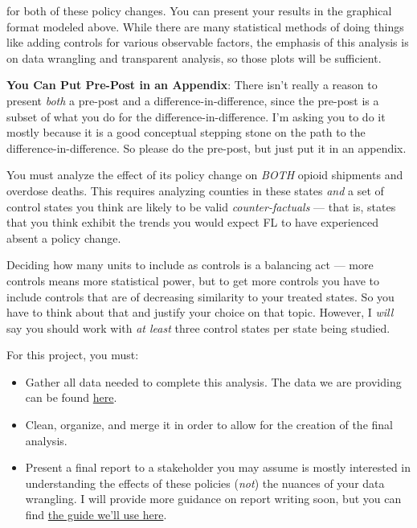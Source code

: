 \documentclass[12pt]{article}
\begin{document}
for both of these policy changes. You can present your results in the graphical format modeled above. While there are many statistical methods of doing things like adding controls for various observable factors, the emphasis of this analysis is on data wrangling and transparent analysis, so those plots will be sufficient.

\textbf{You Can Put Pre-Post in an Appendix}: There isn't really a reason to present \emph{both} a pre-post and a difference-in-difference, since the pre-post is a subset of what you do for the difference-in-difference. I'm asking you to do it mostly because it is a good conceptual stepping stone on the path to the difference-in-difference. So please do the pre-post, but just put it in an appendix.

You must analyze the effect of its policy change on \emph{BOTH} opioid shipments and overdose deaths. This requires analyzing counties in these states \emph{and} a set of control states you think are likely to be valid \emph{counter-factuals} — that is, states that you think exhibit the trends you would expect FL to have experienced absent a policy change. 

Deciding how many units to include as controls is a balancing act — more controls means more statistical power, but to get more controls you have to include controls that are of decreasing similarity to your treated states. So you have to think about that and justify your choice on that topic. However, I \emph{will} say you should work with \emph{at least} three control states per state being studied. 

For this project, you must:

\begin{itemize}
  \item Gather all data needed to complete this analysis. The data we are providing can be found \href{https://github.com/nickeubank/ids540_opioid_data}{here}.
  \item Clean, organize, and merge it in order to allow for the creation of the final analysis.
   \item Present a final report to a stakeholder you may assume is mostly interested in understanding the effects of these policies (\emph{not}) the nuances of your data wrangling. I will provide more guidance on report writing soon, but you can find \href{https://ds4humans.com/40_in_practice/27_data_science_memos.html}{the guide we'll use here}.
\end{itemize}
\end{document}
